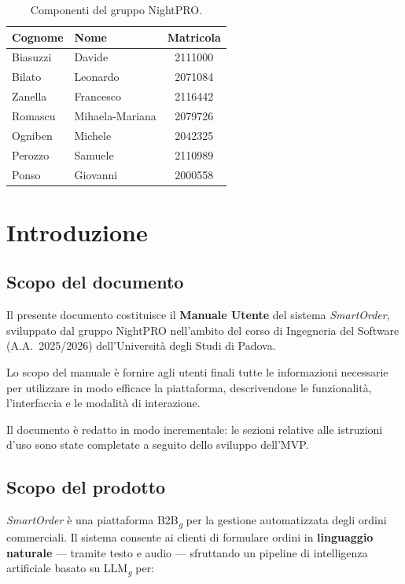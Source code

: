 \documentclass[a4paper, 11pt, oneside]{scrartcl}
\begin{document}
\begin{table}[H]
    \centering
    \renewcommand{\arraystretch}{1.2}
    \begin{tabular}{@{}llc@{}}
        \toprule
        \textbf{Cognome} & \textbf{Nome}   & \textbf{Matricola} \\
        \midrule
        Biasuzzi         & Davide          & 2111000            \\
        Bilato           & Leonardo        & 2071084            \\
        Zanella          & Francesco       & 2116442            \\
        Romascu          & Mihaela-Mariana & 2079726            \\
        Ogniben          & Michele         & 2042325            \\
        Perozzo          & Samuele         & 2110989            \\
        Ponso            & Giovanni        & 2000558            \\
        \bottomrule
    \end{tabular}
    \caption{Componenti del gruppo NightPRO.}
\end{table}

\newpage
\section{Introduzione}

\subsection{Scopo del documento}
Il presente documento costituisce il \textbf{Manuale Utente} del sistema \textit{SmartOrder}, sviluppato dal gruppo NightPRO nell'ambito del corso di Ingegneria del Software (A.A.\ 2025/2026) dell'Universit\`a degli Studi di Padova.

Lo scopo del manuale \`e fornire agli utenti finali tutte le informazioni necessarie per utilizzare in modo efficace la piattaforma, descrivendone le funzionalit\`a, l'interfaccia e le modalit\`a di interazione.

Il documento \`e redatto in modo incrementale: le sezioni relative alle istruzioni d'uso sono state completate a seguito dello sviluppo dell'MVP.

\subsection{Scopo del prodotto}
\textit{SmartOrder} \`e una piattaforma B2B\textsubscript{\textit{g}} per la gestione automatizzata degli ordini commerciali. Il sistema consente ai clienti di formulare ordini in \textbf{linguaggio naturale} --- tramite testo e audio --- sfruttando un pipeline di intelligenza artificiale basato su LLM\textsubscript{\textit{g}} per:
\end{document}
